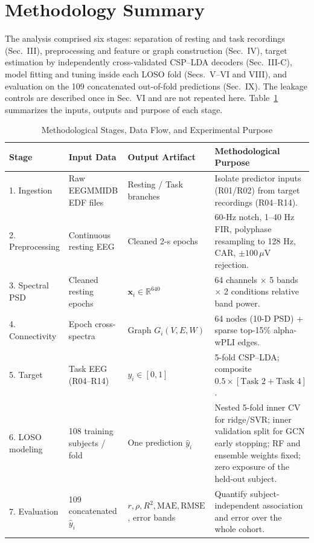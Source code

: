 \documentclass{ieeeaccess}
\begin{document}
\section{Methodology Summary}

The analysis comprised six stages: separation of resting and task recordings (Sec.~III), preprocessing and feature or graph construction (Sec.~IV), target estimation by independently cross-validated CSP--LDA decoders (Sec.~III-C), model fitting and tuning inside each LOSO fold (Secs.~V--VI and VIII), and evaluation on the 109 concatenated out-of-fold predictions (Sec.~IX). The leakage controls are described once in Sec.~VI and are not repeated here. Table~\ref{tab:method_summary} summarizes the inputs, outputs and purpose of each stage.


\begin{table}[!t]
\caption{Methodological Stages, Data Flow, and Experimental Purpose}
\label{tab:method_summary}
\centering
\scriptsize
\begin{tabularx}{\textwidth}{p{1.8cm}p{2.8cm}p{2.8cm}X}
\toprule
\textbf{Stage} & \textbf{Input Data} & \textbf{Output Artifact} & \textbf{Methodological Purpose}\\
\midrule
1. Ingestion & Raw EEGMMIDB EDF files & Resting / Task branches & Isolate predictor inputs (R01/R02) from target recordings (R04--R14).\\
2. Preprocessing & Continuous resting EEG & Cleaned 2-s epochs & 60-Hz notch, 1--40 Hz FIR, polyphase resampling to 128 Hz, CAR, $\pm100\,\mu$V rejection.\\
3. Spectral PSD & Cleaned resting epochs & $\mathbf{x}_i\in\mathbb{R}^{640}$ & 64 channels $\times$ 5 bands $\times$ 2 conditions relative band power.\\
4. Connectivity & Epoch cross-spectra & Graph $G_i(V,E,W)$ & 64 nodes (10-D PSD) + sparse top-15\% alpha-wPLI edges.\\
5. Target & Task EEG (R04--R14) & $y_i\in[0,1]$ & 5-fold CSP--LDA; composite $0.5\times[\text{Task 2}+\text{Task 4}]$.\\
6. LOSO modeling & 108 training subjects / fold & One prediction $\hat y_i$ & Nested 5-fold inner CV for ridge/SVR; inner validation split for GCN early stopping; RF and ensemble weights fixed; zero exposure of the held-out subject.\\
7. Evaluation & 109 concatenated $\hat y_i$ & $r,\rho,R^2,\text{MAE},\text{RMSE}$, error bands & Quantify subject-independent association and error over the whole cohort.\\
\bottomrule
\end{tabularx}
\end{table}
\end{document}
